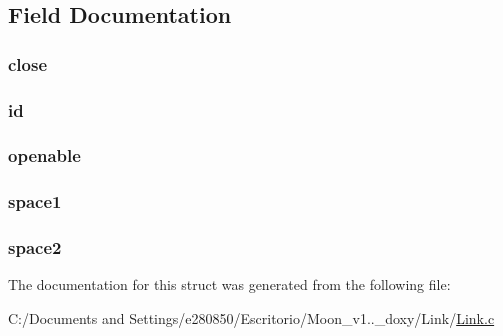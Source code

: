 \subsection{Field Documentation}
\hypertarget{struct___link_a166f8d7959390eedc535f36c6176729c}{
\subsubsection[{close}]{ close}}\label{struct___link_a166f8d7959390eedc535f36c6176729c}
\hypertarget{struct___link_a150a709e86e7134d17cd063de6810b6c}{
\subsubsection[{id}]{ id}}\label{struct___link_a150a709e86e7134d17cd063de6810b6c}
\hypertarget{struct___link_a0f515213497308c25d1d4b405bee4f9b}{
\subsubsection[{openable}]{ openable}}\label{struct___link_a0f515213497308c25d1d4b405bee4f9b}
\hypertarget{struct___link_a601a3f7abdc7f1f82ca2dae2ba31aae6}{
\subsubsection[{space1}]{ space1}}\label{struct___link_a601a3f7abdc7f1f82ca2dae2ba31aae6}
\hypertarget{struct___link_a37b33800211b5ae4d837d1093aa4b3ae}{
\subsubsection[{space2}]{ space2}}\label{struct___link_a37b33800211b5ae4d837d1093aa4b3ae}


The documentation for this struct was generated from the following file\+:\begin{DoxyCompactItemize}
\item 
C\+:/\+Documents and Settings/e280850/\+Escritorio/\+Moon\+\_\+v1..\+\_\+doxy/\+Link/\hyperlink{_link_8c}{Link.\+c}\end{DoxyCompactItemize}
